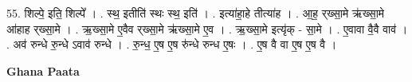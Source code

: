 \documentclass[17pt]{extarticle}
\begin{document}
55. शिल्पे॒ इति॒ शिल्पे᳚ । . स्थ॒ इतीति॑ स्थः स्थ॒ इति॑ । . इत्या॑हा॒हे तीत्या॑ह । . आ॒ह॒ र्‌ख्सा॒मे ऋ॑ख्सा॒मे आ॑हाह र्‌ख्सा॒मे । . ऋ॒ख्सा॒मे ए॒वैव र्‌ख्सा॒मे ऋ॑ख्सा॒मे ए॒व । . ऋ॒ख्सा॒मे इत्यृ॑क् - सा॒मे । . ए॒वावा वै॒वै वाव॑ । . अव॑ रुन्धे रु॒न्धे ऽवाव॑ रुन्धे । . रु॒न्ध॒ ए॒ष ए॒ष रु॑न्धे रुन्ध ए॒षः । . ए॒ष वै वा ए॒ष ए॒ष वै । \newline

\textbf{Ghana Paata } \newline
\end{document}
